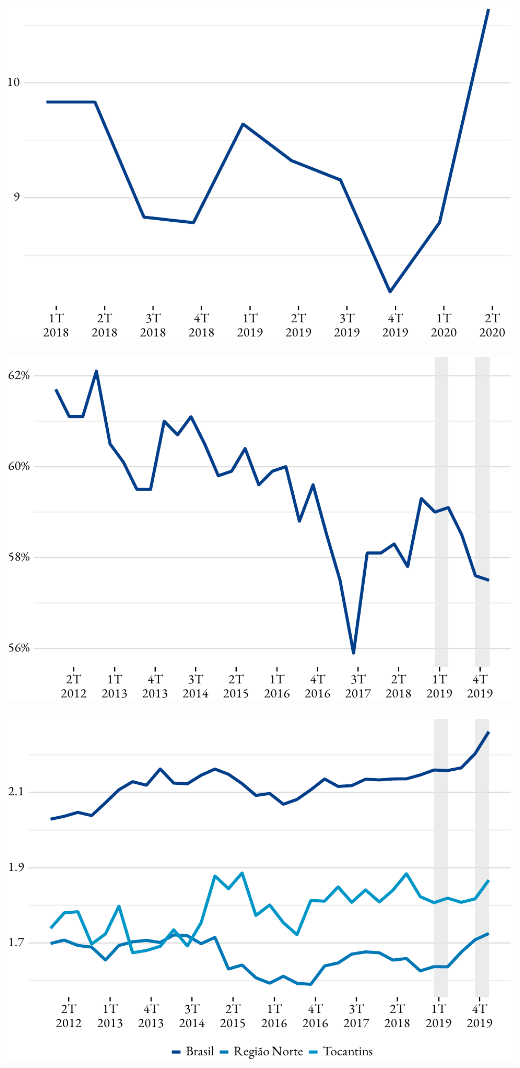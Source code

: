 \includegraphics{fig/pedido_segudo_desem-1.pdf}

\includegraphics{fig/pop_ocupada-1.pdf}

\includegraphics{fig/rend_medio-1.pdf}

